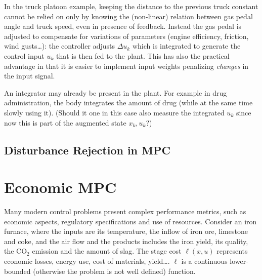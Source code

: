 \documentclass[11pt]{report}
\begin{document}
In the truck platoon example, keeping the distance to the previous truck constant cannot be relied on only by knowing the (non-linear) relation between gas pedal angle and truck speed, even in presence of feedback. Instead the gas pedal is adjusted to compensate for variations of parameters (engine efficiency, friction, wind gusts\ldots): the controller adjusts $\Delta u_k$ which is integrated to generate the control input $u_k$ that is then fed to the plant. This has also the practical advantage in that it is easier to implement input weights penalizing \emph{changes} in the input signal.

An integrator may already be present in the plant. For example in drug administration, the body integrates the amount of drug (while at the same time slowly using it). (Should it one in this case also measure the integrated $u_k$ since now this is part of the augmented state $x_k,u_k$?)

\subsection{Disturbance Rejection in MPC}
\label{sec:disturbance-rejection}



\section{Economic MPC}
\label{sec:economic-mpc}

Many modern control problems present complex performance metrics, such as economic aspects, regulatory specifications and use of resources. Consider an iron furnace, where the inputs are its temperature, the inflow of iron ore, limestone and coke, and the air flow and the products includes the iron yield, its quality, the CO$_2$ emission and the amount of slag. The stage cost $\ell(x,u)$ represents economic losses, energy use, cost of materials, yield\ldots. $\ell$ is a continuous lower-bounded (otherwise the problem is not well defined) function.
\end{document}

